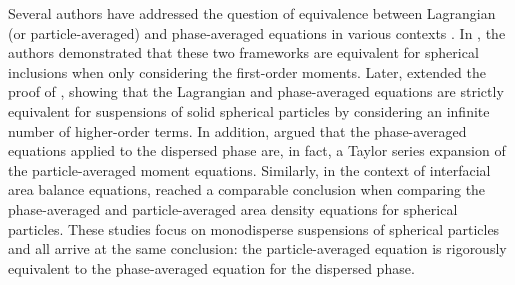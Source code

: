 




Several authors have addressed the question of equivalence between Lagrangian (or particle-averaged) and phase-averaged equations in various contexts \citep{zhang1997momentum,lhuillier2000bilan,nott2011suspension}. 
In \citet[Appendix A]{zhang1997momentum}, the authors demonstrated that these two frameworks are equivalent for spherical inclusions when only considering the first-order moments. 
Later, \citet[Appendix A]{nott2011suspension} extended the proof of \citet{zhang1997momentum}, showing that the Lagrangian and phase-averaged equations are strictly equivalent for suspensions of solid spherical particles by considering an infinite number of higher-order terms. 
In addition, \citet{lhuillier2010multiphase} argued that the phase-averaged equations applied to the dispersed phase are, in fact, a Taylor series expansion of the particle-averaged moment equations.
Similarly, in the context of interfacial area balance equations, \citet{lhuillier2000bilan} reached a comparable conclusion when comparing the phase-averaged and particle-averaged area density equations for spherical particles. 
These studies focus on monodisperse suspensions of spherical particles and all arrive at the same conclusion: the particle-averaged equation is rigorously equivalent to the phase-averaged equation for the dispersed phase.

